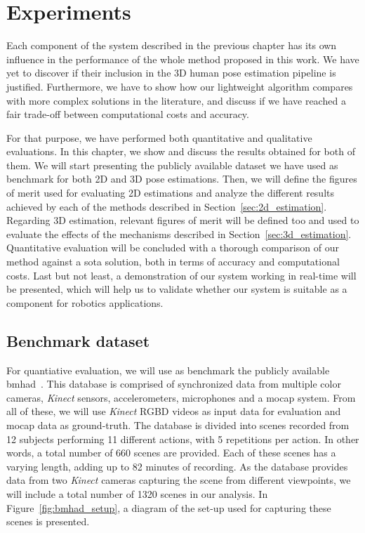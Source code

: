 \chapter{Experiments}\label{ch:experiments}
Each component of the system described in the previous chapter has its own influence in the performance of the whole method proposed in this work. We have yet to discover if their inclusion in the 3D human pose estimation pipeline is justified. Furthermore, we have to show how our lightweight algorithm compares with more complex solutions in the literature, and discuss if we have reached a fair trade-off between computational costs and accuracy.

For that purpose, we have performed both quantitative and qualitative evaluations. In this chapter, we show and discuss the results obtained for both of them. We will start presenting the publicly available dataset we have used as benchmark for both 2D and 3D pose estimations. Then, we will define the figures of merit used for evaluating 2D estimations and analyze the different results achieved by each of the methods described in Section~\ref{sec:2d_estimation}. Regarding 3D estimation, relevant figures of merit will be defined too and used to evaluate the effects of the mechanisms described in Section~\ref{sec:3d_estimation}. Quantitative evaluation will be concluded with a thorough comparison of our method against a \gls{sota} solution, both in terms of accuracy and computational costs. Last but not least, a demonstration of our system working in real-time will be presented, which will help us to validate whether our system is suitable as a component for robotics applications.

\section{Benchmark dataset}\label{sec:benchmark_dataset}
For quantiative evaluation, we will use as benchmark the publicly available \gls{bmhad}~\cite{ofli2013berkeley}. This database is comprised of synchronized data from multiple color cameras, \emph{Kinect} sensors, accelerometers, microphones and a \gls{mocap} system. From all of these, we will use \emph{Kinect} RGBD videos as input data for evaluation and \gls{mocap} data as ground-truth. The database is divided into scenes recorded from 12 subjects performing 11 different actions, with 5 repetitions per action. In other words, a total number of 660 scenes are provided. Each of these scenes has a varying length, adding up to 82 minutes of recording. As the database provides data from two \emph{Kinect} cameras capturing the scene from different viewpoints, we will include a total number of 1320 scenes in our analysis. In Figure~\ref{fig:bmhad_setup}, a diagram of the set-up used for capturing these scenes is presented.


